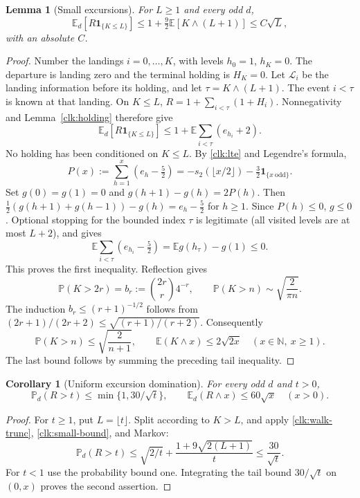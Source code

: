 \documentclass[11pt]{amsart}
\newtheorem{lemma}[theorem]{Lemma}
\newtheorem{corollary}[theorem]{Corollary}
\theoremstyle{definition}
\theoremstyle{remark}
\newcommand{\N}{\mathbb N}
\newcommand{\E}{\mathbb E}
\newcommand{\PP}{\mathbb P}
\newcommand{\one}{\mathbf 1}
\begin{document}
\begin{lemma}[Small excursions]\label{clk:small}
For $L\ge1$ and every odd $d$,
\begin{equation}\label{clk:small-bound}
 \E_d[R\one_{\{K\le L\}}]
       \le1+\tfrac92\E[K\wedge(L+1)]\le C\sqrt L,
\end{equation}
with an absolute $C$.
\end{lemma}
\begin{proof}
Number the landings $i=0,\ldots,K$, with levels $h_0=1$, $h_K=0$.
The departure is landing zero and the terminal holding is $H_K=0$.
Let $\mathcal L_i$ be the landing information before its holding,
and let $\tau=K\wedge(L+1)$. The event $i<\tau$ is known at that
landing. On $K\le L$,
$R=1+\sum_{i<\tau}(1+H_i)$. Nonnegativity and Lemma~\ref{clk:holding}
therefore give
\[
 \E_d[R\one_{\{K\le L\}}]
       \le1+\E\sum_{i<\tau}(e_{h_i}+2).
\]
No holding has been conditioned on $K\le L$. By \eqref{clk:lte} and
Legendre's formula,
\[
 P(x):=\sum_{h=1}^x(e_h-\tfrac52)
   =-s_2(\lfloor x/2\rfloor)-\tfrac32\one_{\{x\ \text{odd}\}}.
\]
Set $g(0)=g(1)=0$ and $g(h+1)-g(h)=2P(h)$. Then
$\tfrac12(g(h+1)+g(h-1))-g(h)=e_h-\tfrac52$ for $h\ge1$.
Since $P(h)\le0$, $g\le0$. Optional stopping for the bounded index
$\tau$ is legitimate (all visited levels are at most $L+2$), and gives
\[
 \E\sum_{i<\tau}(e_{h_i}-\tfrac52)=\E g(h_\tau)-g(1)\le0.
\]
This proves the first inequality. Reflection gives
\begin{equation}\label{clk:walk-tail}
 \PP(K>2r)=b_r:=\binom{2r}{r}4^{-r},\qquad
 \PP(K>n)\sim\sqrt{\frac2{\pi n}}.
\end{equation}
The induction $b_r\le(r+1)^{-1/2}$ follows from
$(2r+1)/(2r+2)\le\sqrt{(r+1)/(r+2)}$. Consequently
\begin{equation}\label{clk:walk-trunc}
 \PP(K>n)\le\sqrt{\frac2{n+1}},\qquad
 \E(K\wedge x)\le2\sqrt{2x}\quad(x\in\N,\ x\ge1).
\end{equation}
The last bound follows by summing the preceding tail inequality.
\end{proof}

\begin{corollary}[Uniform excursion domination]\label{clk:domination}\label{clock:domination}
For every odd $d$ and $t>0$,
\begin{equation}\label{clk:domination-bound}
 \PP_d(R>t)\le\min\{1,30/\sqrt t\},\qquad
 \E_d(R\wedge x)\le60\sqrt x\quad(x>0).
\end{equation}
\end{corollary}
\begin{proof}
For $t\ge1$, put $L=\lfloor t\rfloor$. Split according to $K>L$,
and apply \eqref{clk:walk-trunc}, \eqref{clk:small-bound}, and Markov:
\[
 \PP_d(R>t)\le\sqrt{2/t}
       +\frac{1+9\sqrt{2(L+1)}}t\le\frac{30}{\sqrt t}.
\]
For $t<1$ use the probability bound one. Integrating the tail bound
$30/\sqrt t$ on $(0,x)$ proves the second assertion.
\end{proof}
\end{document}

